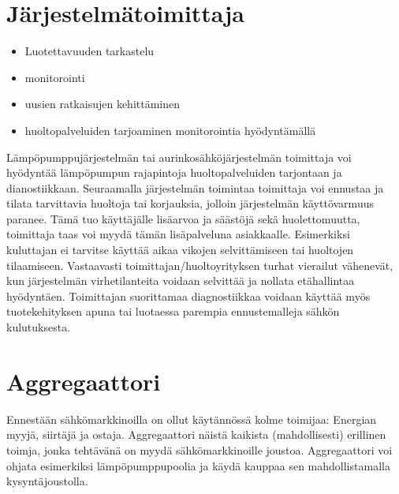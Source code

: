 \section{Järjestelmätoimittaja}
  \begin{itemize}
    \item Luotettavuuden tarkastelu
    \item monitorointi
    \item uusien ratkaisujen kehittäminen
    \item huoltopalveluiden tarjoaminen monitorointia hyödyntämällä
  \end{itemize}

  Lämpöpumppujärjestelmän tai aurinkosähköjärjestelmän toimittaja voi hyödyntää lämpöpumpun rajapintoja huoltopalveluiden tarjontaan ja dianostiikkaan. Seuraamalla järjestelmän toimintaa toimittaja voi ennustaa ja tilata tarvittavia huoltoja tai korjauksia, jolloin järjestelmän käyttövarmuus paranee. Tämä tuo käyttäjälle lisäarvoa ja säästöjä sekä huolettomuutta, toimittaja taas voi myydä tämän lisäpalveluna asiakkaalle. Esimerkiksi kuluttajan ei tarvitse käyttää aikaa vikojen selvittämiseen tai huoltojen tilaamiseen. Vastaavasti toimittajan/huoltoyrityksen turhat vierailut vähenevät, kun järjestelmän virhetilanteita voidaan selvittää ja nollata etähallintaa hyödyntäen. Toimittajan suorittamaa diagnostiikkaa voidaan käyttää myös tuotekehityksen apuna tai luotaessa parempia ennustemalleja sähkön kulutuksesta.

\section{Aggregaattori}

  Ennestään sähkömarkkinoilla on ollut käytännössä kolme toimijaa: Energian myyjä, siirtäjä ja ostaja. Aggregaattori näistä kaikista (mahdollisesti) erillinen toimja, jonka tehtävänä on myydä sähkömarkkinoille joustoa. Aggregaattori voi ohjata esimerkiksi lämpöpumppupoolia ja käydä kauppaa sen mahdollistamalla kysyntäjoustolla.
